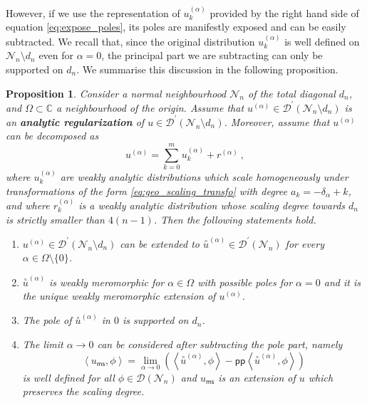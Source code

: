 \documentclass[11pt]{book}
\newcommand{\pp}{\mathsf{pp}}
\newcommand{\ms}{\mathsf{ms}}
\newcommand{\sm}[1]{\left\langle#1\right\rangle}
\newcommand{\exte}[1]{\overset{\circ}{#1}}
\newcommand{\Dcal}{\mathcal{D}}
\newcommand{\Ncal}{\mathcal{N}}
\newcommand{\Cbb}{\mathbb{C}}
\theoremstyle{break}
\newtheorem{proposition}{Proposition}[chapter]
\begin{document}
However, if we use the representation of $u^{(\alpha)}_k$ provided by the right hand side of equation \eqref{eq:expose_poles}, its poles are manifestly exposed and can be easily subtracted. We recall that, since the original distribution $u^{(\alpha)}_k$ is well defined on $\Ncal_n\setminus d_n$ even for $\alpha=0$, the principal part we are subtracting can only be supported on $d_n$. We summarise this discussion in the following proposition.


\begin{proposition}\label{prop:regularization}
Consider a normal neighbourhood $\Ncal_n$ of the total diagonal $d_n$, and $\Omega \subset \Cbb$ a neighbourhood of the origin. Assume that $u^{(\alpha)}\in\Dcal^\prime(\Ncal_n\setminus d_n)$ is an \textbf{analytic regularization} of $u\in\Dcal^\prime(\Ncal_n\setminus d_n)$. Moreover, assume that $u^{(\alpha)}$ can be decomposed as 
%
\begin{equation*}
u^{(\alpha)} = \sum_{k=0}^m u^{(\alpha)}_k + r^{(\alpha)} \ ,
\end{equation*}
%
where $u^{(\alpha)}_k$ are weakly analytic distributions which scale homogeneously under transformations of the form \eqref{eq:geo_scaling_transfo} with degree $a_k = -\delta_\alpha + k$, and where $r^{(\alpha)}_k$ is a weakly analytic distribution whose scaling degree towards $d_n$ is strictly smaller than $4(n-1)$. Then the following statements hold.
%
\begin{enumerate}
\item\label{item:1_regularization} $u^{(\alpha)} \in \Dcal^\prime(\Ncal_n\setminus d_n)$ can be extended to $\exte{u}^{(\alpha)} \in \Dcal^\prime(\Ncal_n)$ for every $\alpha \in \Omega \setminus \{0\}$.
%
\item\label{item:2_regularization} $\exte{u}^{(\alpha)}$ is weakly meromorphic for $\alpha \in \Omega$ with possible poles for $\alpha=0$ and it is the unique weakly meromorphic extension of $u^{(\alpha)}$.
%
\item\label{item:3_regularization} The pole of $\exte{u}^{(\alpha)}$ in $0$ is supported on $d_n$.
%
\item\label{item:4_regularization} The limit $\alpha \to 0$ can be considered after subtracting the pole part, namely
%
\begin{equation*}
\sm{ u_\ms, \phi } = \lim_{\alpha \to 0} \left( \sm{ \exte{u}^{(\alpha)} , \phi } - \pp\sm{ \exte{u}^{(\alpha)} , \phi } \right) 
\end{equation*}
%
is well defined for all $\phi \in \Dcal(\Ncal_n)$ and $u_\ms$ is an extension of $u$ which preserves the scaling degree.
\end{enumerate}
%
\end{proposition}
\end{document}
